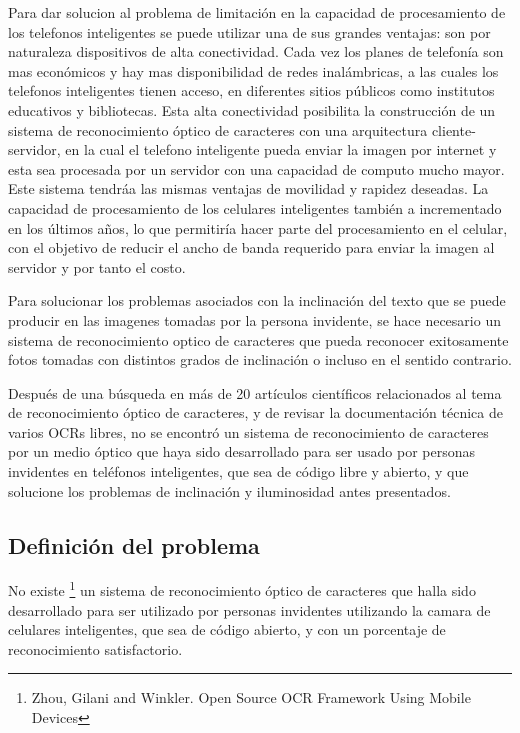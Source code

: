 \documentclass[a4paper, 11pt, oneside]{article}
\begin{document}
	Para dar solucion al problema de limitación en la capacidad de procesamiento de los telefonos inteligentes se puede utilizar una de sus grandes ventajas: son por naturaleza dispositivos de alta conectividad. Cada vez los planes de telefonía son mas económicos y hay mas disponibilidad de redes inalámbricas, a las cuales los telefonos inteligentes tienen acceso, en diferentes sitios públicos como institutos educativos y bibliotecas. Esta alta conectividad posibilita la construcción de un sistema de reconocimiento óptico de caracteres con una arquitectura cliente-servidor, en la cual el telefono inteligente pueda enviar la imagen por internet y esta sea procesada por un servidor con una capacidad de computo mucho mayor. Este sistema tendráa las mismas ventajas de movilidad y rapidez deseadas. La capacidad de procesamiento de los celulares inteligentes también a incrementado en los últimos años, lo que permitiría hacer parte del procesamiento en el celular, con el objetivo de reducir el ancho de banda requerido para enviar la imagen al servidor y por tanto el costo.

	Para solucionar los problemas asociados con la inclinación del texto que se puede producir en las imagenes tomadas por la persona invidente, se hace necesario un sistema de reconocimiento optico de caracteres que pueda reconocer exitosamente fotos tomadas con distintos grados de inclinación o incluso en el sentido contrario.

Después de una búsqueda en más de 20 artículos científicos relacionados al tema de reconocimiento óptico de caracteres, y de revisar la documentación técnica de varios OCRs libres, no se encontró un sistema de reconocimiento de caracteres por un medio óptico que haya sido desarrollado para ser usado por personas invidentes en teléfonos inteligentes, que sea de código libre y abierto, y que solucione los problemas de inclinación y iluminosidad antes presentados. 	
	
	\subsection{Definición del problema}

	No existe \footnote{Zhou, Gilani and Winkler. Open Source OCR Framework Using Mobile Devices}
    un sistema de reconocimiento óptico de caracteres que halla sido desarrollado para
    ser utilizado por personas invidentes utilizando la camara de celulares inteligentes, que sea de código abierto, y con un 
    porcentaje de reconocimiento satisfactorio.
	
\end{document}
